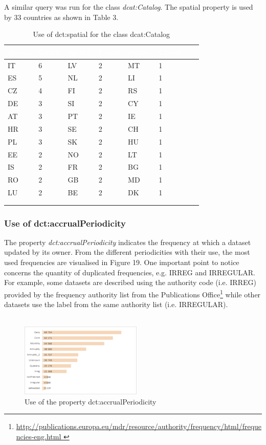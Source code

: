 \documentclass[<options>]{elsarticle}
\begin{document}
A similar query was run for the class \textit{dcat:Catalog}. The spatial property is used by 33 countries as shown in Table 3.

\begin{longtable}{*8l}
\rowcolor{blue!90}
\textcolor{white}{\textbf{spatial}} & \textcolor{white}{\textbf{Count}} & \textcolor{white}{\textbf{spatial}} & \textcolor{white}{\textbf{Count}} & \textcolor{white}{\textbf{spatial}} & \textcolor{white}{\textbf{Count}} \\ \hline
\rowcolor{gray!10} IT &6 &LV &2 &MT &1 \\ \hline
\rowcolor{gray!10} ES &5 &NL &2 &LI &1 \\ \hline
\rowcolor{gray!10} CZ &4 &FI &2 &RS &1 \\ \hline
\rowcolor{gray!10} DE &3 &SI &2 &CY &1 \\ \hline
\rowcolor{gray!10} AT &3 &PT &2 &IE &1 \\ \hline
\rowcolor{gray!10} HR &3 &SE &2 &CH &1 \\ \hline
\rowcolor{gray!10} PL &3 &SK &2 &HU &1 \\ \hline
\rowcolor{gray!10} EE &2 &NO &2 &LT &1 \\ \hline
\rowcolor{gray!10} IS &2 &FR &2 &BG &1 \\ \hline
\rowcolor{gray!10} RO &2 &GB &2 &MD &1 \\ \hline
\rowcolor{gray!10} LU &2 &BE &2 &DK &1 \\ \hline
\\ 
\caption{Use of dct:spatial for the class dcat:Catalog}
\end{longtable}

\subsubsection{Use of dct:accrualPeriodicity}
The property \textit{dct:accrualPeriodicity} indicates the frequency at which a dataset updated by its owner. From the different periodicities with their use, the most used frequencies are visualised in Figure 19. One important point to notice concerns the quantity of duplicated frequencies, e.g. IRREG and IRREGULAR. For example, some datasets are described using the authority code (i.e. IRREG) provided by the frequency authority list from the Publications Office\footnote{\href{http://publications.europa.eu/mdr/resource/authority/frequency/html/frequencies-eng.html }{ http://publications.europa.eu/mdr/resource/authority/frequency/html/frequencies-eng.html }} while other datasets use the label from the same authority list (i.e. IRREGULAR). 
\\
\\
\begin{figure}[H]
\includegraphics{replace22.png}
\caption{Use of the property dct:accrualPeriodicity}
\end{figure}
\end{document}
